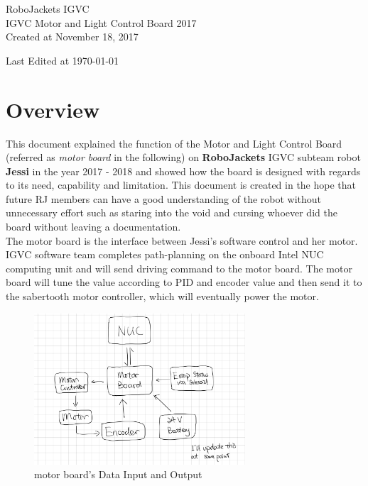 \documentclass[letterpaper, 12pt]{article}
\begin{document}
\begin{titlepage}
\centering
	{\LARGE RoboJackets IGVC}\\
	\vspace{1cm}
	{\Large IGVC Motor and Light Control Board 2017}\\
	\vfill
	{\large Created at November 18, 2017}\\
	\vspace{1cm}
	{\large Last Edited at \today\par}
\end{titlepage}

\tableofcontents

\pagebreak

\section{Overview}
This document explained the function of the Motor and Light Control Board (referred as \emph{motor board} in the following) on \textbf{RoboJackets} IGVC subteam robot \textbf{Jessi} in the year 2017 - 2018 and showed how the board is designed with regards to its need, capability and limitation. This document is created in the hope that future RJ members can have a good understanding of the robot without unnecessary effort such as staring into the void and cursing whoever did the board without leaving a documentation. \vspace{6pt}\\
The motor board is the interface between Jessi's software control and her motor. IGVC software team completes path-planning on the onboard Intel NUC computing unit and will send driving command to the motor board. The motor board will tune the value according to PID and encoder value and then send it to the sabertooth motor controller, which will eventually power the motor.\\
\begin{figure}[h]
\centering
\includegraphics[width=0.7\textwidth]{UpandLow.png}
\caption{motor board's Data Input and Output}
\end{figure}
\end{document}
